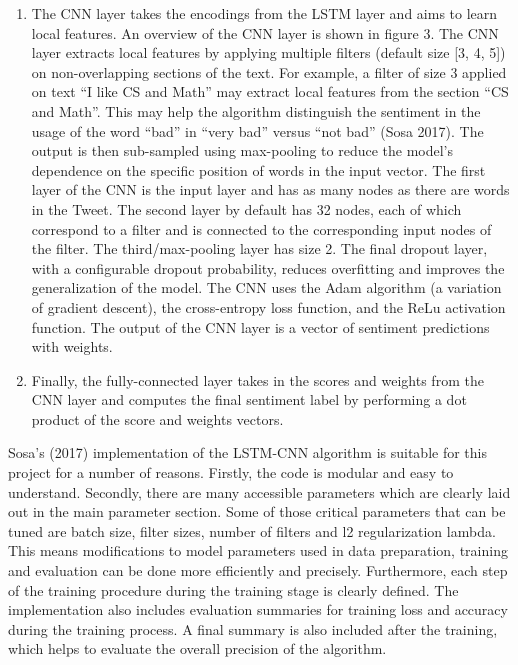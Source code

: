 \documentclass[letterpaper]{article} %
\begin{document}
\begin{enumerate}
	\item The CNN layer takes the encodings from the LSTM layer and aims to learn local features. An overview of the CNN layer is shown in figure 3. The CNN layer extracts local features by applying multiple filters (default size [3, 4, 5]) on non-overlapping sections of the text. For example, a filter of size 3 applied on text \textquotedblleft{}I like CS and Math\textquotedblright{} may extract local features from the section \textquotedblleft{}CS and Math\textquotedblright{}. This may help the algorithm distinguish the sentiment in the usage of the word  \textquotedblleft{}bad\textquotedblright{} in \textquotedblleft{}very bad\textquotedblright{} versus \textquotedblleft{}not bad\textquotedblright{} (Sosa 2017). The output is then sub-sampled using max-pooling to reduce the model's dependence on the specific position of words in the input vector. The first layer of the CNN is the input layer and has as many nodes as there are words in the Tweet. The second layer by default has 32 nodes, each of which correspond to a filter and is connected to the corresponding input nodes of the filter. The third/max-pooling layer has size 2. The final dropout layer, with a configurable dropout probability, reduces overfitting and improves the generalization of the model. The CNN uses the Adam algorithm (a variation of gradient descent), the cross-entropy loss function, and the ReLu activation function. The output of the CNN layer is a vector of sentiment predictions with weights.
	\item Finally, the fully-connected layer takes in the scores and weights from the CNN layer and computes the final sentiment label by performing a dot product of the score and weights vectors. 
\end{enumerate}

Sosa's (2017) implementation of the LSTM-CNN algorithm is suitable for this project for a number of reasons. Firstly, the code is modular and easy to understand. Secondly, there are many accessible parameters which are clearly laid out in the main parameter section. Some of those critical parameters that can be tuned are batch size, filter sizes, number of filters and l2 regularization lambda. This means modifications to model parameters used in data preparation, training and evaluation can be done more efficiently and precisely. Furthermore, each step of the training procedure during the training stage is clearly defined. The implementation also includes evaluation summaries for training loss and accuracy during the training process. A final summary is also included after the training, which helps to evaluate the overall precision of the algorithm.
\end{document}
